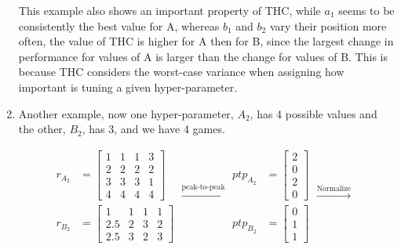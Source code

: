 \begin{enumerate}
    
    This example also shows an important property of THC, while $a_1$ seems to be consistently the best value for A, whereas $b_1$ and $b_2$ vary their position more often, the value of THC is higher for A then for B, since the largest change in performance for values of A is larger than the change for values of B. This is because THC considers the worst-case variance when assigning how important is tuning a given hyper-parameter.
    
    \item Another example, now one hyper-parameter, $A_2$, has 4 possible values and the other, $B_2$, has 3, and we have 4 games.
    
\begin{equation*}
    \begin{aligned}
        r_{A_2} &= \begin{bmatrix}
                    1 & 1 & 1 & 3\\
                    2 & 2 & 2 & 2\\
                    3 & 3 & 3 & 1 \\
                    4 & 4 & 4 & 4
                    \end{bmatrix} \\
        r_{B_2} &= \begin{bmatrix}
                    1 & 1 & 1 & 1\\
                    2.5 & 2 & 3 & 2\\
                    2.5 & 3 & 2 & 3
                    \end{bmatrix}
    \end{aligned}
\xrightarrow{\text{peak-to-peak}}
\begin{aligned}
        ptp_{A_2} &= \begin{bmatrix}
                    2 \\
                    0 \\
                    2 \\
                    0
                    \end{bmatrix} \\
        ptp_{B_2} &= \begin{bmatrix}
                    0 \\
                    1 \\
                    1
                    \end{bmatrix}
    \end{aligned}
\xrightarrow{\text{Normalize}}
\begin{aligned}

\end{aligned}
\end{equation*}
\end{enumerate}
